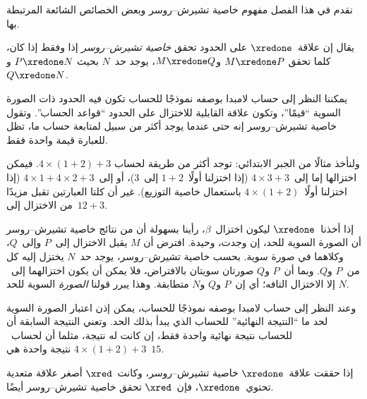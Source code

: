 \documentclass[../../../include/open-logic-section]{subfiles}
\begin{document}


نقدم في هذا الفصل مفهوم خاصية تشيرش--روسر وبعض الخصائص الشائعة
المرتبطة بها.

\begin{defn} يقال إن علاقة~$\xredone$ على
  الحدود تحقق \emph{خاصية تشيرش--روسر} إذا وفقط إذا كان، كلما تحقق
  $M \xredone P$ و$M \xredone Q$، يوجد حد~$N$ بحيث
  $P \xredone N$ و$Q \xredone N$.
\end{defn}

يمكننا النظر إلى حساب لامبدا بوصفه نموذجًا للحساب تكون فيه الحدود ذات
الصورة السوية ``قيمًا''، وتكون علاقة القابلية للاختزال على الحدود
``قواعد الحساب''. وتقول خاصية تشيرش--روسر إنه حتى عندما يوجد أكثر من
سبيل لمتابعة حساب ما، تظل للعبارة قيمة واحدة فقط.

ولنأخذ مثالًا من الجبر الابتدائي: توجد أكثر من طريقة لحساب
$4 \times (1+2) + 3$. فيمكن اختزالها إما إلى~$4 \times 3+3$ (إذا
اختزلنا أولًا~$1+2$ إلى~$3$)، أو إلى~$4 \times 1+4 \times 2+3$
(إذا اختزلنا أولًا~$4 \times (1+2)$ باستعمال خاصية التوزيع). غير أن
كلتا العبارتين تقبل مزيدًا من الاختزال إلى~$12+3$.

إذا أخذنا~$\xredone$ ليكون اختزال~$\beta$، رأينا بسهولة أن من نتائج
خاصية تشيرش--روسر أن الصورة السوية للحد، إن وجدت، وحيدة. افترض أن
$M$ يقبل الاختزال إلى~$P$ وإلى~$Q$، وكلاهما في صورة سوية. بحسب خاصية
تشيرش--روسر، يوجد حد~$N$ يختزل إليه كل من~$P$ و$Q$. وبما أن~$P$
و$Q$ صورتان سويتان بالافتراض، فلا يمكن أن يكون اختزالهما إلى~$N$ إلا
الاختزال التافه؛ أي إن~$P$ و$Q$ و$N$ متطابقة. وهذا يبرر قولنا
\emph{الصورة} السوية للحد.

وعند النظر إلى حساب لامبدا بوصفه نموذجًا للحساب، يمكن إذن اعتبار
الصورة السوية لحد ما ``النتيجة النهائية'' للحساب الذي يبدأ بذلك الحد.
وتعني النتيجة السابقة أن للحساب نتيجة نهائية واحدة فقط، إن كانت له
نتيجة، مثلما أن لحساب~$4 \times (1+2)+3$ نتيجة واحدة هي~$15$.

\begin{thm} 
  إذا حققت علاقة~$\xredone$ خاصية تشيرش--روسر، وكانت~$\xred$ أصغر
  علاقة متعدية تحتوي~$\xredone$، فإن~$\xred$ تحقق خاصية
  تشيرش--روسر أيضًا.
\end{thm}
\end{document}
